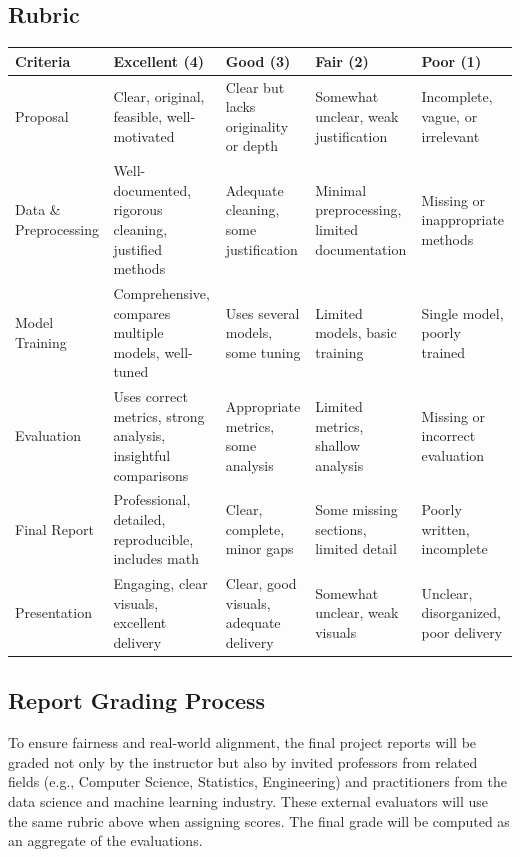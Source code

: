 \documentclass[a4paper,10pt]{article}
\begin{document}
\subsection*{Rubric}
\renewcommand{\arraystretch}{1.4}
\begin{center}
\begin{tabular}{|p{3cm}|p{3cm}|p{3cm}|p{3cm}|p{3cm}|}
    \hline
    \textbf{Criteria} & \textbf{Excellent (4)} & \textbf{Good (3)} & \textbf{Fair (2)} & \textbf{Poor (1)} \\
    \hline
    Proposal & Clear, original, feasible, well-motivated & Clear but lacks originality or depth & Somewhat unclear, weak justification & Incomplete, vague, or irrelevant \\
    \hline
    Data \& Preprocessing & Well-documented, rigorous cleaning, justified methods & Adequate cleaning, some justification & Minimal preprocessing, limited documentation & Missing or inappropriate methods \\
    \hline
    Model Training & Comprehensive, compares multiple models, well-tuned & Uses several models, some tuning & Limited models, basic training & Single model, poorly trained \\
    \hline
    Evaluation & Uses correct metrics, strong analysis, insightful comparisons & Appropriate metrics, some analysis & Limited metrics, shallow analysis & Missing or incorrect evaluation \\
    \hline
    Final Report & Professional, detailed, reproducible, includes math & Clear, complete, minor gaps & Some missing sections, limited detail & Poorly written, incomplete \\
    \hline
    Presentation & Engaging, clear visuals, excellent delivery & Clear, good visuals, adequate delivery & Somewhat unclear, weak visuals & Unclear, disorganized, poor delivery \\
    \hline
\end{tabular}
\end{center}

\subsection*{Report Grading Process}

To ensure fairness and real-world alignment, the final project reports will be graded not only by the instructor but also by invited professors from related fields (e.g., Computer Science, Statistics, Engineering) and practitioners from the data science and machine learning industry. These external evaluators will use the same rubric above when assigning scores. The final grade will be computed as an aggregate of the evaluations.
\end{document}

